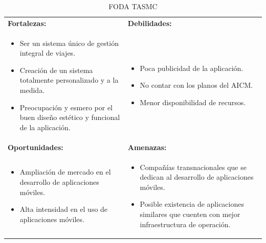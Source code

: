 \begin{table}[h]
	\begin{center}
		\begin{tabular}{|p{6.8cm}|p{6.8cm}|}
			\hline  
				\textbf{\small Fortalezas:} & \textbf{\small Debilidades:} \\
				{\parbox{0.45\textwidth}{
					\begin{itemize}
                			\item \small Ser un sistema único de gestión integral de viajes.
						\item \small Creación de un sistema totalmente personalizado y a la medida.
						\item \small Preocupación y esmero por el buen diseño estético y  funcional de la aplicación.
           			\end{itemize} }} &
				{\parbox{0.45\textwidth}{
					\begin{itemize}
                			\item \small Poca publicidad de la aplicación.
						\item \small No contar con los planos del AICM.
						\item \small Menor disponibilidad de recursos. 
           			\end{itemize} }}	\\
			\hline 
			\textbf{\small Oportunidades:} & \textbf{\small Amenazas:} \\
				{\parbox{0.45\textwidth}{
					\begin{itemize}
                			\item \small Ampliación de mercado en el desarrollo de aplicaciones móviles.
						\item \small Alta intensidad en el uso de aplicaciones móviles.
           			\end{itemize} }} &
				{\parbox{0.45\textwidth}{
					\begin{itemize}
                			\item \small Compañías transnacionales que se dedican al desarrollo de aplicaciones móviles. 
						\item \small Posible existencia de aplicaciones similares que cuenten con mejor infraestructura de operación. 
           			\end{itemize} }}	\\
			\hline 
		\end{tabular}
	\end{center}
	\caption[FODA TASMC]{FODA TASMC} 
	\label{tab:fodaTASMC}
\end{table}